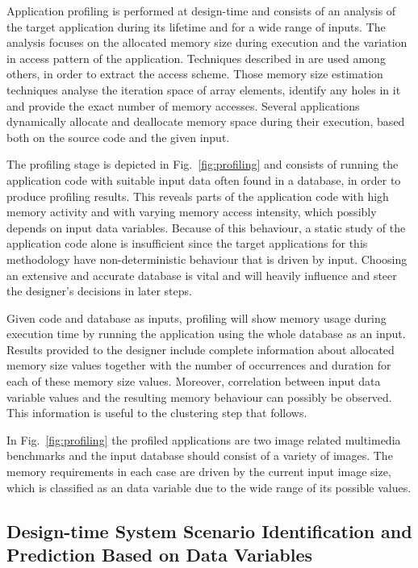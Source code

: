 \documentclass{acm_proc_article-sp}
\begin{document}
Application profiling is performed at design-time and consists of an analysis of the target application during its lifetime and for a wide range of inputs. The analysis focuses on the allocated memory size during execution and the variation in access pattern of the application. Techniques described in \cite{Ang13b} are used among others, in order to extract the access scheme. Those memory size estimation techniques analyse the iteration space of array elements, identify any holes in it and provide the exact number of memory accesses. Several applications dynamically allocate and deallocate memory space during their execution, based both on the source code and the given input. 

The profiling stage is depicted in Fig.~\ref{fig:profiling} and consists of running the application code with suitable input data often found in a database, in order to produce profiling results. This reveals parts of the application code with high memory activity and with varying memory access intensity, which possibly depends on input data variables. Because of this behaviour, a static study of the application code alone is insufficient since the target applications for this methodology have non-deterministic behaviour that is driven by input. Choosing an extensive and accurate database is vital and will heavily influence and steer the designer's decisions in later steps. 

Given code and database as inputs, profiling will show memory usage during execution time by running the application using the whole database as an input. Results provided to the designer include complete information about allocated memory size values together with the number of occurrences and duration for each of these memory size values. Moreover, correlation between input data variable values and the resulting memory behaviour can possibly be observed. This information is useful to the clustering step that follows. 

In Fig.~\ref{fig:profiling} the profiled applications are two image related multimedia benchmarks and the input database should consist of a variety of images. The memory requirements in each case are driven by the current input image size, which is classified as an data variable due to the wide range of its possible values. 

\subsection{Design-time System Scenario Identification and Prediction Based on Data Variables}
\end{document}
